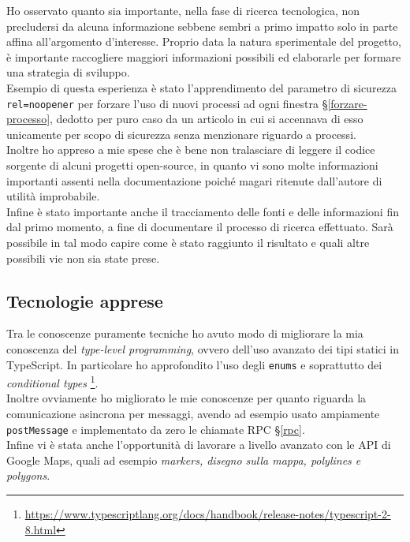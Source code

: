 Ho osservato quanto sia importante, nella fase di ricerca tecnologica, non precludersi da alcuna informazione sebbene sembri a primo impatto solo in parte affina all'argomento d'interesse. Proprio data la natura sperimentale del progetto, è importante raccogliere maggiori informazioni possibili ed elaborarle per formare una strategia di sviluppo. \\

Esempio di questa esperienza è stato l'apprendimento del parametro di sicurezza \texttt{rel=noopener} per forzare l'uso di nuovi processi ad ogni finestra §\ref{forzare-processo}, dedotto per puro caso da un articolo in cui si accennava di esso unicamente per scopo di sicurezza senza menzionare riguardo a processi. \\

Inoltre ho appreso a mie spese che è bene non tralasciare di leggere il codice sorgente di alcuni progetti open-source, in quanto vi sono molte informazioni importanti assenti nella documentazione poiché magari ritenute dall'autore di utilità improbabile. \\

Infine è stato importante anche il tracciamento delle fonti e delle informazioni fin dal primo momento, a fine di documentare il processo di ricerca effettuato. Sarà possibile in tal modo capire come è stato raggiunto il risultato e quali altre possibili vie non sia state prese.

\subsection{Tecnologie apprese}

Tra le conoscenze puramente tecniche ho avuto modo di migliorare la mia conoscenza del \textit{type-level programming}, ovvero dell'uso avanzato dei tipi statici in TypeScript. In particolare ho approfondito l'uso degli \texttt{enums} e soprattutto dei \textit{conditional types} \footnote{\url{https://www.typescriptlang.org/docs/handbook/release-notes/typescript-2-8.html}}. \\

Inoltre ovviamente ho migliorato le mie conoscenze per quanto riguarda la comunicazione asincrona per messaggi, avendo ad esempio usato ampiamente \texttt{postMessage} e implementato da zero le chiamate RPC §\ref{rpc}. \\

Infine vi è stata anche l'opportunità di lavorare a livello avanzato con le API di Google Maps, quali ad esempio \textit{markers, disegno sulla mappa, polylines e polygons}.

